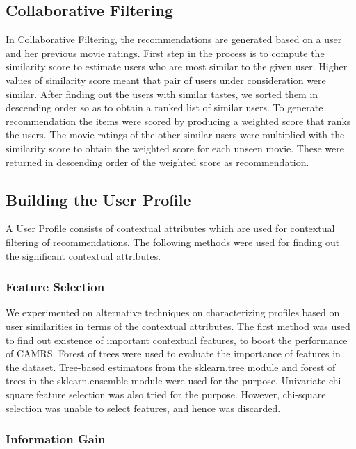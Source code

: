 \documentclass{article}
\begin{document}
\subsection{Collaborative Filtering}
In Collaborative Filtering, the recommendations are generated based on a user and her previous movie ratings. First step in the process is to compute the similarity score to estimate users who are most similar to the given user. Higher values of similarity score meant that pair of users under consideration were similar. After finding out the users with similar tastes, we sorted them in descending order so as to obtain a ranked list of similar users. To generate recommendation the items were scored by producing a weighted score that
ranks the users. The movie ratings of the other similar users were multiplied with the similarity score to obtain the weighted score for each unseen movie. These were returned in descending order of the weighted score as recommendation. \cite{segaran2008programming}  

\subsection{Building the User Profile}

A User Profile consists of contextual attributes which are used for contextual filtering of recommendations. The following methods were used for finding out the significant contextual attributes.

\subsubsection{Feature Selection}

We experimented on alternative techniques on characterizing profiles based on user similarities in terms of the contextual attributes. The first method was used to find out existence of important contextual features, to boost the performance of CAMRS. Forest of trees were used to evaluate the importance of features in the dataset. Tree-based estimators from the sklearn.tree module and forest of trees in the sklearn.ensemble module were used for the purpose. Univariate chi-square feature selection was also tried for the purpose. However, chi-square selection was unable to select features, and hence was discarded.

\subsubsection{Information Gain}
\end{document}

